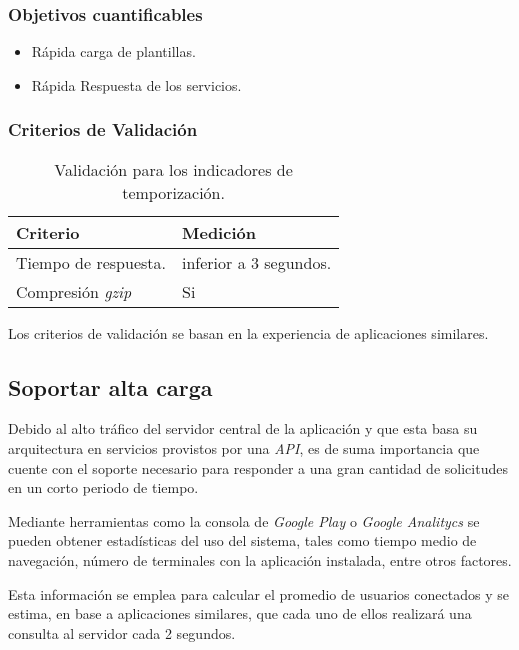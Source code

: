 \subsubsection{Objetivos cuantificables}

\begin{itemize}
	\item
	Rápida carga de plantillas.
	\item
	Rápida Respuesta de los servicios.
\end{itemize}

\subsubsection{Criterios de Validación}

\begin{table}[H]
    \caption[Validación para los indicadores de temporización.] {Validación para los indicadores de temporización.}
    \label{tbl:Criterios de Validación temporización}
    \begin{tabular}{|p{}|p{}|}
        \hline
        \textbf{Criterio} &  \textbf{Medición}\\
    	\hline
    	\hline
    	Tiempo de respuesta.  & inferior a 3 segundos. \\ \hline
		Compresión \textit{gzip}   & Si \\ 
        \hline
    \end{tabular}
\end{table}
Los criterios de validación se basan en la experiencia de aplicaciones similares.

\subsection{Soportar alta carga}

Debido al alto tráfico del servidor central de la aplicación y que esta basa su arquitectura en servicios provistos por una \textit{API}, es de suma importancia que cuente con el soporte necesario para responder a una gran cantidad de solicitudes en un corto periodo de tiempo.

Mediante herramientas como la consola de \textit{Google Play} o \textit{ Google Analitycs} se pueden obtener estadísticas del uso del sistema, tales como tiempo medio de navegación, número de terminales con la aplicación instalada, entre otros factores.

Esta información se emplea para calcular el promedio de usuarios conectados y se estima, en base a aplicaciones similares, que cada uno de ellos realizará una consulta al servidor cada 2 segundos.

